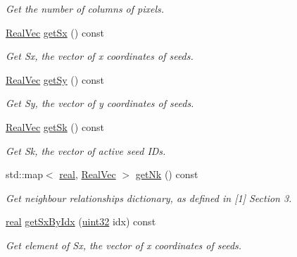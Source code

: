 \begin{DoxyCompactItemize}
\begin{DoxyCompactList}\small\item\em Get the number of columns of pixels. \end{DoxyCompactList}\item 
\mbox{\hyperlink{typedefs_8h_a84b6d9a0fbb45e01ad4a3aa5667f2992}{Real\+Vec}} \mbox{\hyperlink{classvd_a309203fb398a885176ae985a8906e886}{get\+Sx}} () const
\begin{DoxyCompactList}\small\item\em Get Sx, the vector of x coordinates of seeds. \end{DoxyCompactList}\item 
\mbox{\hyperlink{typedefs_8h_a84b6d9a0fbb45e01ad4a3aa5667f2992}{Real\+Vec}} \mbox{\hyperlink{classvd_a704c56db9a9782e1c82d3d199ddfd699}{get\+Sy}} () const
\begin{DoxyCompactList}\small\item\em Get Sy, the vector of y coordinates of seeds. \end{DoxyCompactList}\item 
\mbox{\hyperlink{typedefs_8h_a84b6d9a0fbb45e01ad4a3aa5667f2992}{Real\+Vec}} \mbox{\hyperlink{classvd_adf9f15df018d2ceff5f68bdf7bd6f613}{get\+Sk}} () const
\begin{DoxyCompactList}\small\item\em Get Sk, the vector of active seed I\+Ds. \end{DoxyCompactList}\item 
std\+::map$<$ \mbox{\hyperlink{typedefs_8h_a58a0c7cf2501f4492da833421be92547}{real}}, \mbox{\hyperlink{typedefs_8h_a84b6d9a0fbb45e01ad4a3aa5667f2992}{Real\+Vec}} $>$ \mbox{\hyperlink{classvd_a90613fc46f246a5450e26487caff33f9}{get\+Nk}} () const
\begin{DoxyCompactList}\small\item\em Get neighbour relationships dictionary, as defined in \mbox{[}1\mbox{]} Section 3. \end{DoxyCompactList}\item 
\mbox{\hyperlink{typedefs_8h_a58a0c7cf2501f4492da833421be92547}{real}} \mbox{\hyperlink{classvd_a960d4b8fbedb7cbb0686ad42e19d6396}{get\+Sx\+By\+Idx}} (\mbox{\hyperlink{typedefs_8h_a8ad23e2333787a214e20a58a284a5a60}{uint32}} idx) const
\begin{DoxyCompactList}\small\item\em Get element of Sx, the vector of x coordinates of seeds. \end{DoxyCompactList}\item 

\end{DoxyCompactItemize}
